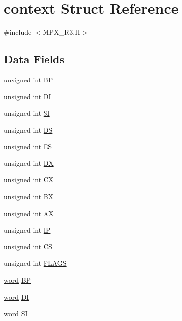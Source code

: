 \hypertarget{structcontext}{
\section{context Struct Reference}
\label{structcontext}
}


{\ttfamily \#include $<$MPX\_\-R3.H$>$}

\subsection*{Data Fields}
\begin{DoxyCompactItemize}
\item 
unsigned int \hyperlink{structcontext_a036a2e025f269d00b084e69796f45680}{BP}
\item 
unsigned int \hyperlink{structcontext_a71fd72ac821b4c932ad6f5befd4a5ea4}{DI}
\item 
unsigned int \hyperlink{structcontext_a6b7fc81c19dfbd3a1438eb7738a712d8}{SI}
\item 
unsigned int \hyperlink{structcontext_a657e73663a4443be61a078d31c28ee3e}{DS}
\item 
unsigned int \hyperlink{structcontext_a81a78fef7bda3a5dd852b28a905890ab}{ES}
\item 
unsigned int \hyperlink{structcontext_a520e6d1f4fcf543e914e536248da306e}{DX}
\item 
unsigned int \hyperlink{structcontext_a7f06dbf351fa2b704708aadf139eb1d4}{CX}
\item 
unsigned int \hyperlink{structcontext_acd2a72acb8e494afd3c30c3614e567ee}{BX}
\item 
unsigned int \hyperlink{structcontext_ac566b46485abbfc32ce69987dfbd0d1f}{AX}
\item 
unsigned int \hyperlink{structcontext_a02ac427e75af0dfe7d649dc8821cde0a}{IP}
\item 
unsigned int \hyperlink{structcontext_a0b41903d1fa3b4e1ce892f59480323b5}{CS}
\item 
unsigned int \hyperlink{structcontext_a251dc5ae40a989bef945d2df6925f9a3}{FLAGS}
\item 
\hyperlink{trmdrive_8c_a285e72252c100e2508e4e933a0738f2b}{word} \hyperlink{structcontext_ace4c0a7cb726c8222771263a8045ca6f}{BP}
\item 
\hyperlink{trmdrive_8c_a285e72252c100e2508e4e933a0738f2b}{word} \hyperlink{structcontext_ac4670fc443363dcb63982933e6f56858}{DI}
\item 
\hyperlink{trmdrive_8c_a285e72252c100e2508e4e933a0738f2b}{word} \hyperlink{structcontext_ad8b8154f6a98c5e72b28e6031f135c74}{SI}

\end{DoxyCompactItemize}

